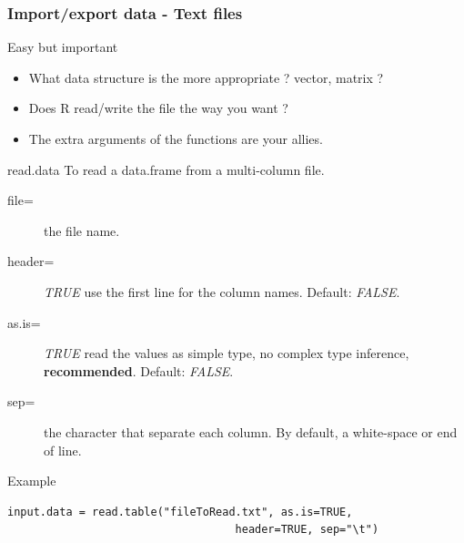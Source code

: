 \documentclass[10pt]{beamer}
\newenvironment{xframe}[2][]
  {\begin{frame}[fragile,environment=xframe,#1]
  \frametitle{#2}}
  {\end{frame}}
\begin{document}
\begin{xframe}[shrink=5]{Import/export data - Text files}
  \begin{block}{Easy but important}
    \begin{itemize}
    \item What data structure is the more appropriate ? {\sf vector}, {\sf matrix} ?
    \item Does R read/write the file the way you want ?
    \item The extra arguments of the functions are your allies.
    \end{itemize}
  \end{block}
  \begin{block}{{\sf read.data}}
    To read a {\sf data.frame} from a multi-column file.
    \begin{description}
    \item[file=] the file name.
    \item[header=] {\it TRUE} use the first line for the column names. Default: {\it FALSE}.
    \item[as.is=] {\it TRUE} read the values as simple type, no complex type inference, {\bf recommended}. Default: {\it FALSE}. 
    \item[sep=] the character that separate each column. By default, a white-space or end of line.
    \end{description}
  \end{block}
  \begin{exampleblock}{Example}
\begin{verbatim}
input.data = read.table("fileToRead.txt", as.is=TRUE,
                                   header=TRUE, sep="\t")
\end{verbatim}  
  \end{exampleblock}
\end{xframe}

\end{document}
